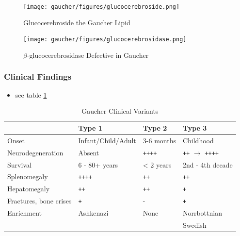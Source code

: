 \documentclass[12pt]{scrartcl}
\begin{document}
\begin{figure}[htbp]
\centering
\texttt{[image: gaucher/figures/glucocerebroside.png]}
\caption{\label{fig:org0f66345}Glucocerebroside the Gaucher Lipid}
\end{figure}

\begin{figure}[htbp]
\centering
\texttt{[image: gaucher/figures/glucocerebrosidase.png]}
\caption{\label{fig:org2464626}\(\beta\)-glucocerebrosidase Defective in Gaucher}
\end{figure}

\subsubsection{Clinical Findings}
\label{sec:org843546c}
\begin{itemize}
\item see table \ref{tab:org618e9d4}
\end{itemize}

\begin{table}[htbp]
\caption{\label{tab:org618e9d4}Gaucher Clinical Variants}
\centering
\begin{tabular}{llll}
 & Type 1 & Type 2 & Type 3\\
\hline
Onset & Infant/Child/Adult & 3-6 months & Childhood\\
Neurodegeneration & Absent & \texttt{++++} & \texttt{++} \(\to\) \texttt{++++}\\
Survival & 6 - 80+ years & < 2 years & 2nd - 4th decade\\
Splenomegaly & \texttt{++++} & \texttt{++} & \texttt{++}\\
Hepatomegaly & \texttt{++} & \texttt{++} & \texttt{+}\\
Fractures, bone crises & \texttt{+} & - & \texttt{+}\\
Enrichment & Ashkenazi & None & Norrbottnian\\
 &  &  & Swedish\\
\end{tabular}
\end{table}
\end{document}
